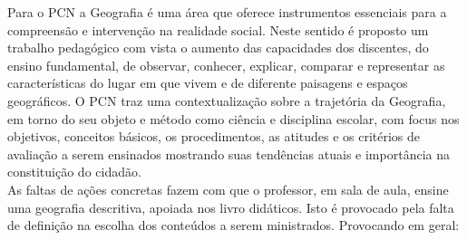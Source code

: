 Para o PCN a Geografia é uma área que oferece instrumentos essenciais para a compreensão e intervenção na realidade social. Neste sentido  é proposto um trabalho pedagógico com vista o aumento das capacidades dos discentes, do ensino fundamental, de observar, conhecer, explicar, comparar e representar as características do lugar em que vivem e de diferente paisagens e espaços geográficos. O PCN traz uma contextualização sobre a trajetória da Geografia, em torno do seu objeto e método como ciência e disciplina escolar, com focus nos objetivos, conceitos básicos, os procedimentos, as atitudes e os critérios de avaliação a serem ensinados mostrando suas tendências atuais e importância na constituição do cidadão.\\

As faltas de ações concretas fazem com que o professor, em sala de aula,  ensine uma geografia descritiva, apoiada nos livro didáticos. Isto é provocado pela falta de definição na escolha dos conteúdos a serem ministrados. Provocando em geral:

